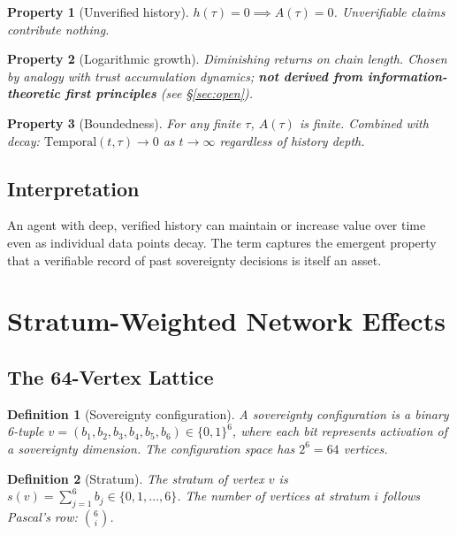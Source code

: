 \documentclass[11pt,a4paper]{article}
\newtheorem{definition}{Definition}[section]
\newtheorem{property}{Property}[section]
\begin{document}
\begin{property}[Unverified history]
$h(\tau) = 0 \implies A(\tau) = 0$. Unverifiable claims contribute nothing.
\end{property}

\begin{property}[Logarithmic growth]
Diminishing returns on chain length. Chosen by analogy with trust accumulation dynamics; \textbf{not derived from information-theoretic first principles} (see \S\ref{sec:open}).
\end{property}

\begin{property}[Boundedness]
For any finite $\tau$, $A(\tau)$ is finite. Combined with decay: $\mathrm{Temporal}(t,\tau) \to 0$ as $t \to \infty$ regardless of history depth.
\end{property}

\subsection{Interpretation}

An agent with deep, verified history can maintain or increase value over time even as individual data points decay. The term captures the emergent property that a verifiable record of past sovereignty decisions is itself an asset.

\section{Stratum-Weighted Network Effects}
\label{sec:network}

\subsection{The 64-Vertex Lattice}

\begin{definition}[Sovereignty configuration]
A sovereignty configuration is a binary 6-tuple $v = (b_1, b_2, b_3, b_4, b_5, b_6) \in \{0,1\}^6$, where each bit represents activation of a sovereignty dimension. The configuration space has $2^6 = 64$ vertices.
\end{definition}

\begin{definition}[Stratum]
The stratum of vertex $v$ is $s(v) = \sum_{j=1}^{6} b_j \in \{0,1,\ldots,6\}$. The number of vertices at stratum $i$ follows Pascal's row: $\binom{6}{i}$.
\end{definition}
\end{document}
